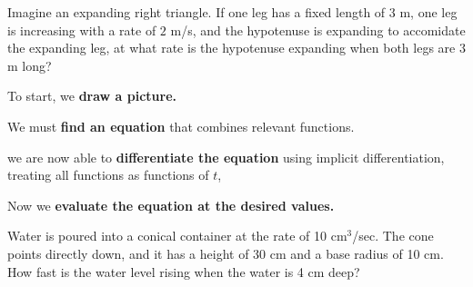 \documentclass{ximera}
\begin{document}
\begin{example}
  Imagine an expanding right triangle. If one leg has a fixed length
  of $3$ m, one leg is increasing with a rate of $2$ m/s, and the
  hypotenuse is expanding to accomidate the expanding leg, at what
  rate is the hypotenuse expanding when both legs are $3$ m long? 
  \begin{explanation}
    To start, we \textbf{draw a picture.}
 

    We must \textbf{find an equation} that combines relevant
    functions.

    
    we are now able to \textbf{differentiate the equation} using
    implicit differentiation, treating all functions as functions of
    $t$,

   
    Now we \textbf{evaluate the equation at the desired values.}
    
  \end{explanation}
\end{example}



\begin{example} Water is poured into a conical container at the rate of 10
cm${}^3$/sec.  The cone points directly down, and it has a height of
30 cm and a base radius of 10 cm.  How fast is the water level rising
when the water is 4 cm deep?
\end{example}
\end{document}
